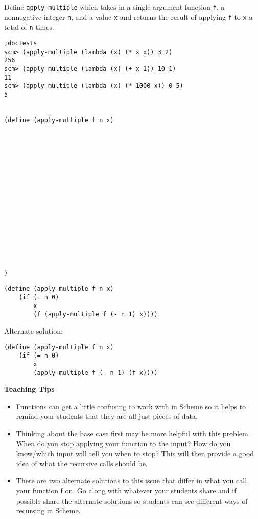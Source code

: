 \begin{blocksection}
\question Define \lstinline{apply-multiple} which takes in a single argument function \lstinline{f}, 
a nonnegative integer \lstinline{n}, and a value \lstinline{x} and returns the result of applying 
\lstinline{f} to \lstinline{x} a total of \lstinline{n} times.

\begin{lstlisting}
;doctests
scm> (apply-multiple (lambda (x) (* x x)) 3 2)
256
scm> (apply-multiple (lambda (x) (+ x 1)) 10 1)
11
scm> (apply-multiple (lambda (x) (* 1000 x)) 0 5)
5


(define (apply-multiple f n x)

















)
\end{lstlisting}
\begin{solution}
\begin{lstlisting}
(define (apply-multiple f n x)
    (if (= n 0)
        x
        (f (apply-multiple f (- n 1) x))))
\end{lstlisting}

Alternate solution:

\begin{lstlisting}
(define (apply-multiple f n x)
    (if (= n 0)
        x
        (apply-multiple f (- n 1) (f x))))
\end{lstlisting}
\end{solution}
\end{blocksection}

\begin{blocksection}
\begin{guide}
\textbf{Teaching Tips}
\begin{itemize}
	\item Functions can get a little confusing to work with in Scheme so it helps to remind your students that they are all just pieces of data.
	\item Thinking about the base case first may be more helpful with this problem. When do you stop applying your function to the input? How do you know/which input will tell you when to stop? This will then provide a good idea of what the recursive calls should be.
	\item There are two alternate solutions to this issue that differ in what you call your function f on. Go along with whatever your students share and if possible share the alternate solutions so students can see different ways of recursing in Scheme.
\end{itemize}
\end{guide}
\end{blocksection}